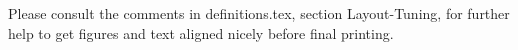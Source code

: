 Please consult the comments in definitions.tex, section Layout-Tuning, for further help to get figures and text aligned nicely before final printing.

\enlargethispage{4\baselineskip}



